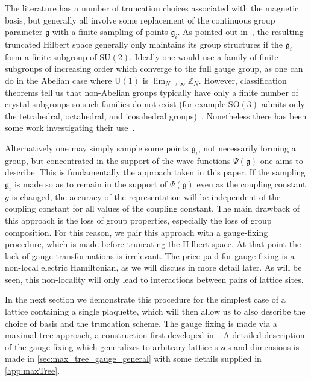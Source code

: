 \documentclass[reprint,superscriptaddress,pra,nofootinbib,preprintnumbers,floatfix]{revtex4-1}
\providecommand{\uone}{$\mathrm{U}(1)$\xspace}
\providecommand{\sutwo}{$\mathrm{SU}(2)$\xspace}
\providecommand{\sothree}{$\mathrm{SO}(3)$\xspace}
\providecommand{\g}{{\mathfrak{g}}}
\begin{document}
The literature has a number of truncation choices associated with the magnetic basis, but generally all involve some replacement of the continuous group parameter $\g$ with a finite sampling of points $\g_i$. 
%
As pointed out in~\cite{Lamm2020,Lamm2022,Zohar:2021nyc}, the resulting truncated Hilbert space generally only maintains its group structures if the $\g_i$ form a finite subgroup of \sutwo. 
%
Ideally one would use a family of finite subgroups of increasing order which converge to the full gauge group, as one can do in the Abelian case where \uone is $\lim_{N\to\infty} \mathbb{Z}_N$. 
%
However, classification theorems tell us that non-Abelian groups typically have only a finite number of crystal subgroups so such families do not exist (for example \sothree admits only the tetrahedral, octahedral, and icosahedral groups)~\cite{conwaybook2004}.
%
Nonetheless there has been some work investigating their use~\cite{Alexandru:2019nsa,Lamm2022,Lamm2020,Bender:2018rdp,Alam:2021uuq,Zache:2023cfj,Gonzalez-Cuadra:2022hxt,Ji:2022qvr,Alexandru:2021jpm}.



Alternatively one may simply sample some points $\g_i$, not necessarily forming a group, but concentrated in the support of the wave functions $\Psi(\g)$ one aims to describe.
%
This is fundamentally the approach taken in this paper. 
%
If the sampling $\g_i$ is made so as to remain in the support of $\Psi(\g)$ even as the coupling constant $g$ is changed, the accuracy of the representation will be independent of the coupling constant for all values of the coupling constant. 
%
The main drawback of this approach is the loss of group properties, especially the loss of group composition. 
%
For this reason, we pair this approach with a gauge-fixing procedure, which is made before truncating the Hilbert space. 
%
At that point the lack of gauge transformations is irrelevant. 
%
The price paid for gauge fixing is a non-local electric Hamiltonian, as we will discuss in more detail later.
%
As will be seen, this non-locality will only lead to interactions between pairs of lattice sites.



In the next section we demonstrate this procedure for the simplest case of a lattice containing a single plaquette, which will then allow us to also describe the choice of basis and the truncation scheme. 
%
The gauge fixing is made via a maximal tree approach, a construction first developed in~\cite{PhysRevD.15.1128}.
%
A detailed description of the gauge fixing which generalizes to arbitrary lattice sizes and dimensions is made in \cref{sec:max_tree_gauge_general} with some details supplied in \cref{app:maxTree}.
\end{document}
